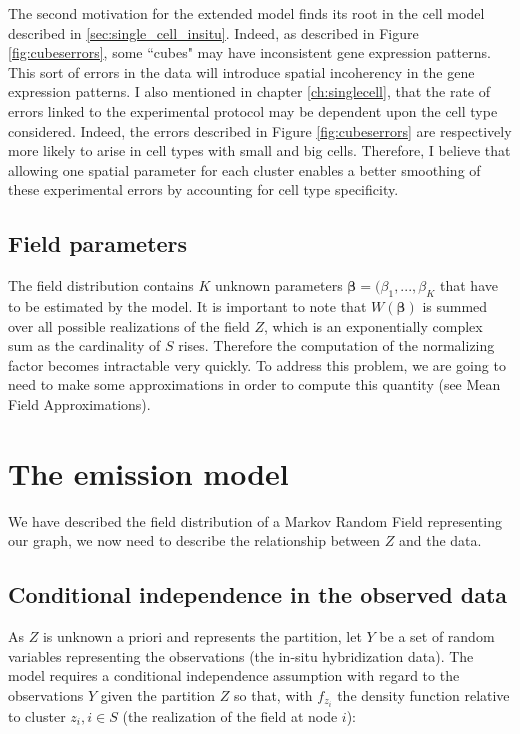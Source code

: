   The second motivation for the extended model finds its root in the cell model described in \ref{sec:single_cell_insitu}. Indeed, as described in Figure \ref{fig:cubeserrors}, some ``cubes" may have inconsistent gene expression patterns. This sort of errors in the data will introduce spatial incoherency in the gene expression patterns. I also mentioned in chapter \ref{ch:singlecell}, that the rate of errors linked to the experimental protocol may be dependent upon the cell type considered. Indeed, the errors described in Figure \ref{fig:cubeserrors} are respectively more likely to arise in cell types with small and big cells. Therefore, I believe that allowing one spatial parameter for each cluster enables a better smoothing of these experimental errors by accounting for cell type specificity.\\
 
 \subsection{Field parameters}

The field distribution contains $K$ unknown parameters $\boldsymbol{\beta} = (\beta_{1},...,\beta_{K}$ that have to be estimated by the model. It is important to note that $W(\boldsymbol{\beta})$ is summed over all possible realizations of the field $Z$, which is an exponentially complex sum as the cardinality of $S$ rises. Therefore the computation of the normalizing factor becomes intractable very quickly. To address this problem, we are going to need to make some approximations in order to compute this quantity (see Mean Field Approximations).\\

\section{The emission model}

We have described the field distribution of a Markov Random Field representing our graph, we now need to describe the relationship between $Z$ and the data.

\subsection{Conditional independence in the observed data}
As $Z$ is unknown a priori and represents the partition, let $Y$ be a set of random variables representing the observations (the in-situ hybridization data). The model requires a conditional independence assumption with regard to the observations $Y$ given the partition $Z$ so that, with $f_{z_i}$ the density function relative to cluster $z_i, i \in S$ (the realization of the field at node $i$):

